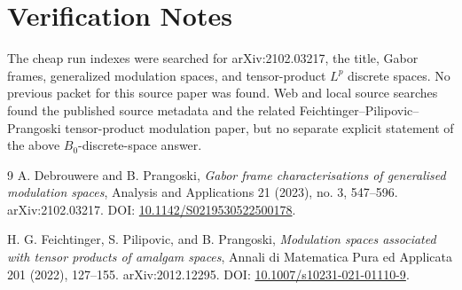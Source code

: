 \documentclass[11pt]{article}
\begin{document}
\section*{Verification Notes}

The cheap run indexes were searched for arXiv:2102.03217, the title, Gabor
frames, generalized modulation spaces, and tensor-product \(L^p\) discrete
spaces. No previous packet for this source paper was found. Web and local
source searches found the published source metadata and the related
Feichtinger--Pilipovic--Prangoski tensor-product modulation paper, but no
separate explicit statement of the above \(B_0\)-discrete-space answer.

\begin{thebibliography}{9}
A. Debrouwere and B. Prangoski,
\emph{Gabor frame characterisations of generalised modulation spaces},
Analysis and Applications 21 (2023), no. 3, 547--596.
arXiv:2102.03217. DOI:
\href{https://doi.org/10.1142/S0219530522500178}{10.1142/S0219530522500178}.

H. G. Feichtinger, S. Pilipovic, and B. Prangoski,
\emph{Modulation spaces associated with tensor products of amalgam spaces},
Annali di Matematica Pura ed Applicata 201 (2022), 127--155.
arXiv:2012.12295. DOI:
\href{https://doi.org/10.1007/s10231-021-01110-9}{10.1007/s10231-021-01110-9}.
\end{thebibliography}
\end{document}
